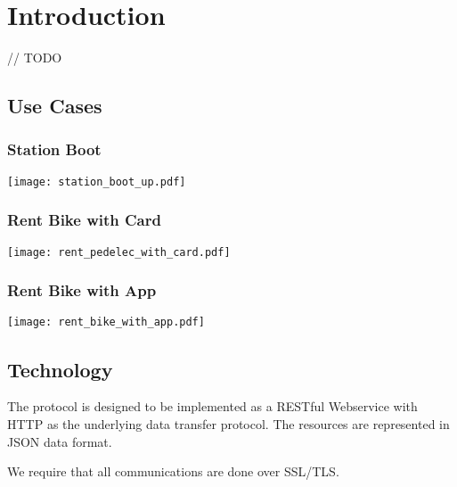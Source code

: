 \section{Introduction}

// TODO


\subsection{Use Cases}

\subsubsection{Station Boot}

\texttt{[image: station\_boot\_up.pdf]}


\subsubsection{Rent Bike with Card}

\texttt{[image: rent\_pedelec\_with\_card.pdf]}

\subsubsection{Rent Bike with App}

\texttt{[image: rent\_bike\_with\_app.pdf]}


\subsection{Technology}

The protocol is designed to be implemented as a RESTful Webservice with HTTP as the underlying data transfer protocol. The resources are represented in JSON data format.

We require that all communications are done over SSL/TLS.